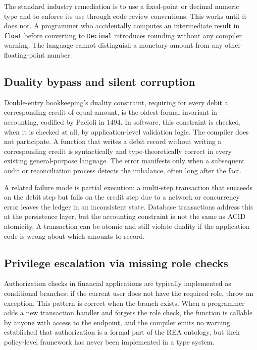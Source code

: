 \documentclass[11pt,a4paper]{article}
\theoremstyle{remark}
\begin{document}
The standard industry remediation is to use a fixed-point or decimal
numeric type and to enforce its use through code review conventions.
This works until it does not. A programmer who accidentally computes an
intermediate result in \texttt{float} before converting to
\texttt{Decimal} introduces rounding without any compiler warning. The
language cannot distinguish a monetary amount from any other
floating-point number.

\subsection{Duality bypass and silent corruption}

Double-entry bookkeeping's duality constraint, requiring for every debit
a corresponding credit of equal amount, is the oldest formal invariant
in accounting, codified by Pacioli in 1494. In software, this constraint
is checked, when it is checked at all, by application-level validation
logic. The compiler does not participate. A function that writes a debit
record without writing a corresponding credit is syntactically and
type-theoretically correct in every existing general-purpose language.
The error manifests only when a subsequent audit or reconciliation
process detects the imbalance, often long after the fact.

A related failure mode is partial execution: a multi-step transaction
that succeeds on the debit step but fails on the credit step due to a
network or concurrency error leaves the ledger in an inconsistent state.
Database transactions address this at the persistence layer, but the
accounting constraint is not the same as ACID atomicity. A transaction
can be atomic and still violate duality if the application code is wrong
about which amounts to record.

\subsection{Privilege escalation via missing role checks}

Authorization checks in financial applications are typically implemented
as conditional branches: if the current user does not have the required
role, throw an exception. This pattern is correct when the branch
exists. When a programmer adds a new transaction handler and forgets the
role check, the function is callable by anyone with access to the
endpoint, and the compiler emits no warning. \citet{geerts_policy-level_2006}
established that authorization is a formal part of the REA ontology, but
their policy-level framework has never been implemented in a type
system.
\end{document}
